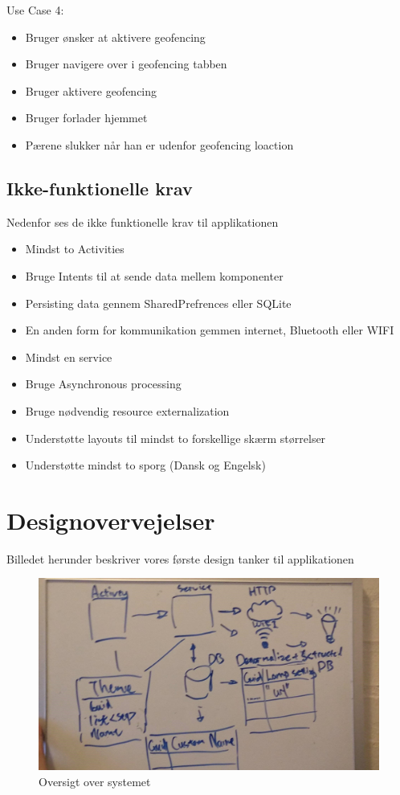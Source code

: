 		Use Case 4:
		\begin{itemize}
			\item Bruger ønsker at aktivere geofencing
			\item Bruger navigere over i geofencing tabben
			\item Bruger aktivere geofencing
			\item Bruger forlader hjemmet
			\item Pærene slukker når han er udenfor geofencing loaction
		\end{itemize}
		
		\subsection{Ikke-funktionelle krav}
		Nedenfor ses de ikke funktionelle krav til applikationen
		\begin{itemize}
			\item Mindst to Activities
			\item Bruge Intents til at sende data mellem komponenter
			\item Persisting data gennem SharedPrefrences eller SQLite
			\item En anden form for kommunikation gemmen internet, Bluetooth eller WIFI
			\item Mindst en service
			\item Bruge Asynchronous processing
			\item Bruge nødvendig resource externalization
			\item Understøtte layouts til mindst to forskellige skærm størrelser
			\item Understøtte mindst to sporg (Dansk og Engelsk)
		\end{itemize}
				
		\section{Designovervejelser}
		Billedet herunder beskriver vores første design tanker til applikationen
		\begin{figure}[H]
			\centering
			\includegraphics[width=0.9\linewidth]{Kravspecifikation/Designovervejelser}
			\caption{Oversigt over systemet}
			\label{fig:Designovervejelser}
		\end{figure}
		\newpage	
				
